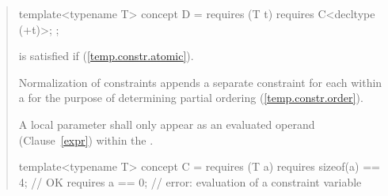 \begin{quote}
\begin{addedblock}
\begin{codeblock}
template<typename T> concept D =
  requires (T t) {
    requires C<decltype (+t)>;
  };
\end{codeblock}
 is satisfied if  (\ref{temp.constr.atomic}).
\exitexample

\pnum
\enternote
Normalization of constraints appends a separate constraint for each
 within a 
for the purpose of determining partial ordering (\ref{temp.constr.order}).
\exitnote

\pnum
A local parameter shall only appear as an evaluated operand 
(Clause~\ref{expr}) within the .
\enterexample
\begin{codeblock}
template<typename T> 
  concept C = requires (T a) {
    requires sizeof(a) == 4; // OK
    requires a == 0;         // error: evaluation of a constraint variable
  }
\end{codeblock}
\exitexample






\begin{comment}

\rSec3[temp.constr.deduct]{Argument deduction constraints}

\pnum
An \defn{argument deduction constraint} is a constraint that specifies 
a requirement that the type of an \grammarterm{expression} \tcode{E}
can be deduced from a type \tcode{T}, when \tcode{T} includes one or more 
placeholders (\ref{dcl.spec.auto}).
% 
\enternote
An argument deduction constraint is introduced by a
\grammarterm{compound-requirement} (\ref{expr.prim.req.compound}) having a
\grammarterm{trailing-return-type} that contains one or more placeholders.
% 
In such a constraint, \tcode{E} is the \grammarterm{expression} of the 
\grammarterm{compound-requirement}, and \tcode{T} is the type specified
by the \grammarterm{trailing-return-type}.
\exitnote

\pnum
To determine if an argument deduction constraint is satisfied, invent
an abbreviated function template \tcode{f} with one parameter whose
type is \tcode{T} (\ref{dcl.fct}). 
% 
The constraint is satisfied if the resolution of the function call 
\tcode{f(E)} succeeds (\ref{over.match}).
% 
\enternote
Overload resolution succeeds when values are deduced for all invented
template parameters in \tcode{f} that correspond to the placeholders in 
\tcode{T}, and the constraints associated by any 
\grammarterm{constrained-type-specifier}{s} are satisfied.
\exitnote
% 
\enterexample
\begin{codeblock}
template<typename T, typename U> struct Pair;


\end{comment}
\end{addedblock}
\end{quote}
